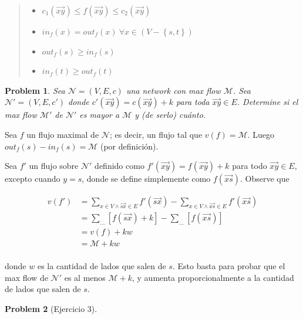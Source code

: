 \documentclass[a4paper, 12pt]{article}
\newtheorem{problem}{Problem}
\newtheorem{problem}{Problem}
\begin{document}
\begin{quote}
    \begin{itemize}
        \item $c_1(\overrightarrow{xy}) \leq f(\overrightarrow{xy}) \leq c_2(\overrightarrow{xy})$
        \item $in_f(x) = out_f(x) ~ \forall x \in \left( V - \left\{ s, t \right\}  \right) $
        \item $out_f(s) \geq in_f(s) $
        \item $in_f(t) \geq out_f(t) $
    \end{itemize}
\end{quote}

\begin{problem}
    Sea $\mathcal{N} = (V, E, c)$ una network con max flow $\mathcal{M}$. Sea
    $\mathcal{N}' = (V, E, c')$ donde $c'(\overrightarrow{xy}) =
    c(\overrightarrow{xy}) + k$ para toda $\overrightarrow{xy} \in E$. Determine
    si el max flow $\mathcal{M}'$ de $\mathcal{N}'$ es mayor a $\mathcal{M}$ y
    (de serlo) cuánto.
\end{problem}

Sea $f$ un flujo maximal de $\mathcal{N}$; es decir, un flujo tal que $v(f) =
\mathcal{M}$. Luego $out_f(s) - in_f(s) = \mathcal{M}$ (por definición).

Sea $f'$ un flujo sobre $\mathcal{N}'$ definido como $f'(\overrightarrow{xy}) =
f(\overrightarrow{xy}) + k$ para todo $\overrightarrow{xy} \in E$, excepto
cuando $y = s$, donde se define simplemente como $f(\overrightarrow{xs})$. Observe que

\begin{align*}
    v(f') &= \sum_{x \in V \land \overrightarrow{sx} \in E}
    f'(\overrightarrow{sx}) - \sum_{x \in V \land  \overrightarrow{xs} \in E}
    f'(\overrightarrow{xs}) \\ 
    &= \sum_{\ldots} \left[ f(\overrightarrow{sx}) + k \right]  - \sum_{\ldots}
    \left[ f(\overrightarrow{xs})\right]  \\ 
    &= v(f) + kw  \\ 
    &= \mathcal{M} + kw \\ 
\end{align*}

donde $w$ es la cantidad de lados que salen de $s$. 
Esto basta para probar que el max flow de $\mathcal{N}'$ es al menos
$\mathcal{M} + k$, y aumenta proporcionalmente a la cantidad de lados que salen
de $s$.

\begin{problem}[Ejercicio 3]

    
\end{problem}
\end{document}
